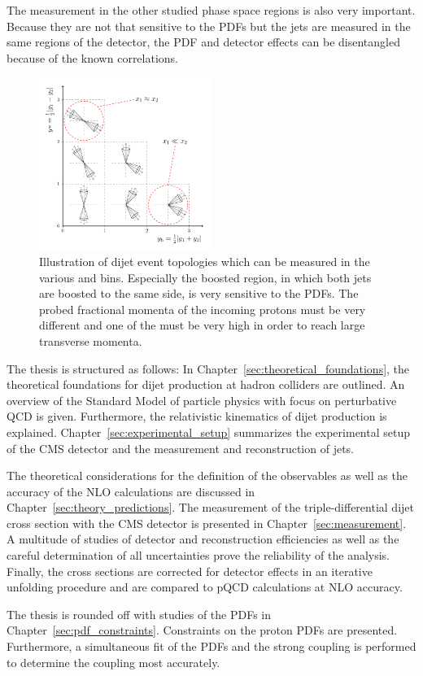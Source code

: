 The measurement in the other studied phase space regions is also very important.
Because they are not that sensitive to the PDFs but the jets are measured in the same
regions of the detector, the PDF and detector effects can be disentangled
because of the known correlations.

\begin{figure}
    \centering
    \caption[Illustration of dijet topologies various \ystar and \yboost bins]{
             Illustration of dijet event topologies which can be measured in
             the various \ystar and \yboost bins. Especially the boosted region,
             in which both jets are boosted to the same side, is very sensitive to the PDFs. 
             The probed fractional momenta of the incoming protons must be very
             different and one of the must be very high in order to reach large
             transverse momenta.}
    \label{fig:intro_ybys_hint}
    \includegraphics[width=0.5\textwidth]{figures/drawings/ybys_hint.pdf}
\end{figure}

The thesis is structured as follows: In
Chapter~\ref{sec:theoretical_foundations}, the theoretical foundations for dijet
production at hadron colliders are outlined. An overview of the Standard Model
of particle physics with focus on perturbative QCD is given.  Furthermore, the
relativistic kinematics of dijet production is explained.
Chapter~\ref{sec:experimental_setup} summarizes the experimental setup of the
CMS detector and the measurement and reconstruction of jets. 

The theoretical considerations for the definition of the observables as well as
the accuracy of the NLO calculations are discussed in
Chapter~\ref{sec:theory_predictions}. The measurement of the triple-differential
dijet cross section with the CMS detector is presented in
Chapter~\ref{sec:measurement}. A multitude of studies of detector and
reconstruction efficiencies as well as the careful determination of all
uncertainties prove the reliability of the analysis.  Finally, the cross
sections are corrected for detector effects in an iterative unfolding procedure
and are compared to pQCD calculations at NLO accuracy.

The thesis is rounded off with studies of the PDFs in
Chapter~\ref{sec:pdf_constraints}. Constraints on the proton PDFs are presented.
Furthermore, a simultaneous fit of the PDFs and the strong coupling is performed
to determine the coupling most accurately.

